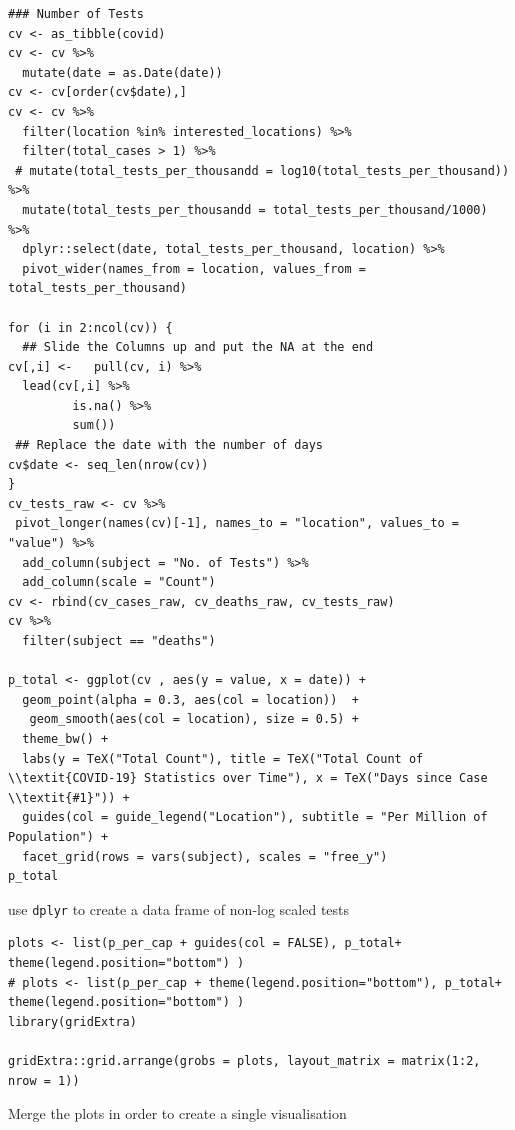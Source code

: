 \documentclass[11pt]{article}
\begin{document}
\begin{listing}[htbp]
\begin{verbatim}
### Number of Tests
cv <- as_tibble(covid)
cv <- cv %>%
  mutate(date = as.Date(date))
cv <- cv[order(cv$date),]
cv <- cv %>%
  filter(location %in% interested_locations) %>%
  filter(total_cases > 1) %>%
 # mutate(total_tests_per_thousandd = log10(total_tests_per_thousand)) %>%
  mutate(total_tests_per_thousandd = total_tests_per_thousand/1000) %>%
  dplyr::select(date, total_tests_per_thousand, location) %>%
  pivot_wider(names_from = location, values_from = total_tests_per_thousand)

for (i in 2:ncol(cv)) {
  ## Slide the Columns up and put the NA at the end
cv[,i] <-   pull(cv, i) %>%
  lead(cv[,i] %>%
         is.na() %>%
         sum())
 ## Replace the date with the number of days
cv$date <- seq_len(nrow(cv))
}
cv_tests_raw <- cv %>%
 pivot_longer(names(cv)[-1], names_to = "location", values_to = "value") %>%
  add_column(subject = "No. of Tests") %>%
  add_column(scale = "Count")
cv <- rbind(cv_cases_raw, cv_deaths_raw, cv_tests_raw)
cv %>%
  filter(subject == "deaths")

p_total <- ggplot(cv , aes(y = value, x = date)) +
  geom_point(alpha = 0.3, aes(col = location))  +
   geom_smooth(aes(col = location), size = 0.5) +
  theme_bw() +
  labs(y = TeX("Total Count"), title = TeX("Total Count of \\textit{COVID-19} Statistics over Time"), x = TeX("Days since Case \\textit{#1}")) +
  guides(col = guide_legend("Location"), subtitle = "Per Million of Population") +
  facet_grid(rows = vars(subject), scales = "free_y")
p_total
\end{verbatim}
\caption{\label{orgb139824}use \texttt{dplyr} to create a data frame of non-log scaled tests}
\end{listing}

\begin{listing}[htbp]
\begin{verbatim}
plots <- list(p_per_cap + guides(col = FALSE), p_total+ theme(legend.position="bottom") )
# plots <- list(p_per_cap + theme(legend.position="bottom"), p_total+ theme(legend.position="bottom") )
library(gridExtra)

gridExtra::grid.arrange(grobs = plots, layout_matrix = matrix(1:2, nrow = 1))
\end{verbatim}
\caption{\label{org9a24cde}Merge the plots in order to create a single visualisation}
\end{listing}
\end{document}
